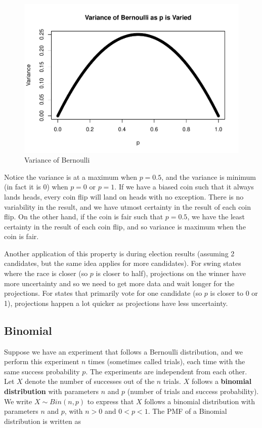 \documentclass[
]{book}
\begin{document}
\begin{figure}
\centering
\includegraphics{bookdown-demo_files/figure-latex/3-varBern-1.pdf}
\caption{\label{fig:3-varBern}Variance of Bernoulli}
\end{figure}

Notice the variance is at a maximum when \(p=0.5\), and the variance is minimum (in fact it is 0) when \(p=0\) or \(p=1\). If we have a biased coin such that it always lands heads, every coin flip will land on heads with no exception. There is no variability in the result, and we have utmost certainty in the result of each coin flip. On the other hand, if the coin is fair such that \(p=0.5\), we have the least certainty in the result of each coin flip, and so variance is maximum when the coin is fair.

Another application of this property is during election results (assuming 2 candidates, but the same idea applies for more candidates). For swing states where the race is closer (so \(p\) is closer to half), projections on the winner have more uncertainty and so we need to get more data and wait longer for the projections. For states that primarily vote for one candidate (so \(p\) is closer to 0 or 1), projections happen a lot quicker as projections have less uncertainty.

\hypertarget{binomial}{%
\subsection{Binomial}\label{binomial}}

Suppose we have an experiment that follows a Bernoulli distribution, and we perform this experiment \(n\) times (sometimes called trials), each time with the same success probability \(p\). The experiments are independent from each other. Let \(X\) denote the number of successes out of the \(n\) trials. \(X\) follows a \textbf{binomial distribution} with parameters \(n\) and \(p\) (number of trials and success probability). We write \(X \sim Bin(n,p)\) to express that \(X\) follows a binomial distribution with parameters \(n\) and \(p\), with \(n>0\) and \(0<p<1\). The PMF of a Binomial distribution is written as
\end{document}
